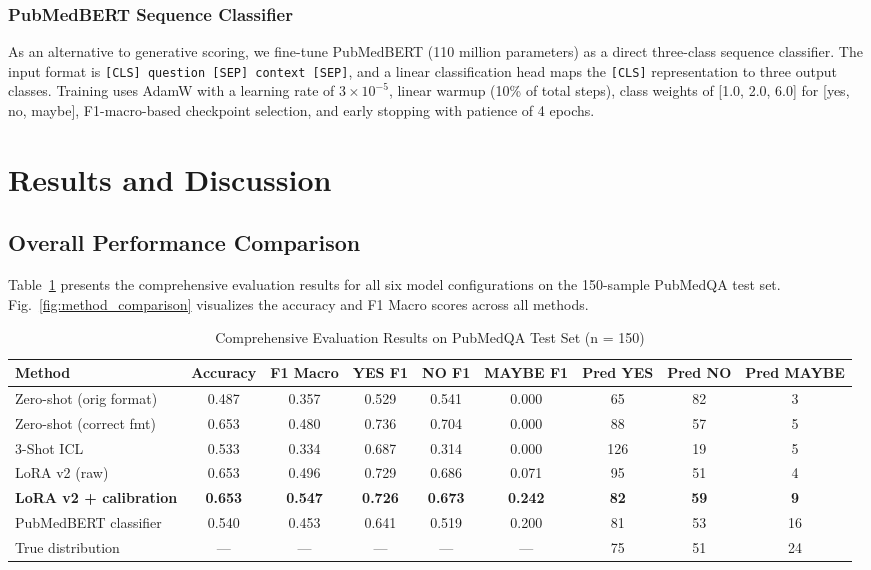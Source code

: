 \documentclass[conference]{IEEEtran}
\begin{document}
\subsubsection{PubMedBERT Sequence Classifier}

As an alternative to generative scoring, we fine-tune PubMedBERT (110 million parameters) as a direct three-class sequence classifier. The input format is \texttt{[CLS] question [SEP] context [SEP]}, and a linear classification head maps the \texttt{[CLS]} representation to three output classes. Training uses AdamW with a learning rate of $3 \times 10^{-5}$, linear warmup (10\% of total steps), class weights of [1.0, 2.0, 6.0] for [yes, no, maybe], F1-macro-based checkpoint selection, and early stopping with patience of 4 epochs.


\section{Results and Discussion}

\subsection{Overall Performance Comparison}

Table~\ref{tab:results} presents the comprehensive evaluation results for all six model configurations on the 150-sample PubMedQA test set. Fig.~\ref{fig:method_comparison} visualizes the accuracy and F1 Macro scores across all methods.

\begin{table}[t]
\centering
\caption{Comprehensive Evaluation Results on PubMedQA Test Set (n = 150)}
\label{tab:results}
\begin{tabular}{lcccccccc}
\toprule
\textbf{Method} & \textbf{Accuracy} & \textbf{F1 Macro} & \textbf{YES F1} & \textbf{NO F1} & \textbf{MAYBE F1} & \textbf{Pred YES} & \textbf{Pred NO} & \textbf{Pred MAYBE} \\
\midrule
Zero-shot (orig format) & 0.487 & 0.357 & 0.529 & 0.541 & 0.000 & 65 & 82 & 3 \\
Zero-shot (correct fmt) & 0.653 & 0.480 & 0.736 & 0.704 & 0.000 & 88 & 57 & 5 \\
3-Shot ICL & 0.533 & 0.334 & 0.687 & 0.314 & 0.000 & 126 & 19 & 5 \\
LoRA v2 (raw) & 0.653 & 0.496 & 0.729 & 0.686 & 0.071 & 95 & 51 & 4 \\
\textbf{LoRA v2 + calibration} & \textbf{0.653} & \textbf{0.547} & \textbf{0.726} & \textbf{0.673} & \textbf{0.242} & \textbf{82} & \textbf{59} & \textbf{9} \\
PubMedBERT classifier & 0.540 & 0.453 & 0.641 & 0.519 & 0.200 & 81 & 53 & 16 \\
\midrule
True distribution & --- & --- & --- & --- & --- & 75 & 51 & 24 \\
\bottomrule
\end{tabular}
\end{table}
\end{document}
